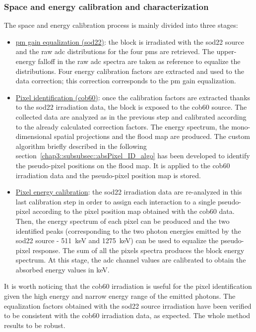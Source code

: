 \subsubsection{Space and energy calibration and characterization}\label{chap3::subsubsec::absSpaceEnMethod}

The space and energy calibration process is mainly divided into three stages:
\begin{itemize}
\item \underline{\gls{pm} gain equalization (\gls{sod22})}: the block is irradiated with the \gls{sod22} source and the raw \gls{adc} distributions for the four \glspl{pm} are retrieved. The upper-energy falloff in the raw \gls{adc} spectra are taken as reference to equalize the distributions. Four energy calibration factors are extracted and used to the data correction; this correction corresponds to the \gls{pm} gain equalization.

\item \underline{Pixel identification (\gls{cob60})}: once the calibration factors are extracted thanks to the \gls{sod22} irradiation data, the block is exposed to the \gls{cob60} source. The collected data are analyzed as in the previous step and calibrated according to the already calculated correction factors. The energy spectrum, the mono-dimensional spatial projections and the flood map are produced. The custom algorithm briefly described in the following section~\ref{chap3::subsubsec::absPixel_ID_algo} has been developed to identify the pseudo-pixel positions on the flood map. It is applied to the \gls{cob60} irradiation data and the pseudo-pixel position map is stored. 

\item \underline{Pixel energy calibration}: the \gls{sod22} irradiation data are re-analyzed in this last calibration step in order to assign each interaction to a single pseudo-pixel according to the pixel position map obtained with the \gls{cob60} data. Then, the energy spectrum of each pixel can be produced and the two identified peaks (corresponding to the two photon energies emitted by the \gls{sod22} source - 511~keV and 1275~keV) can be used to equalize the pseudo-pixel response. The sum of all the pixels spectra produces the block energy spectrum. At this stage, the \gls{adc} channel values are calibrated to obtain the absorbed energy values in keV.     
\end{itemize}

It is worth noticing that the \gls{cob60} irradiation is useful for the pixel identification given the high energy and narrow energy range of the emitted photons. The equalization factors obtained with the \gls{sod22} source irradiation have been verified to be consistent with the \gls{cob60} irradiation data, as expected. The whole method results to be robust.

